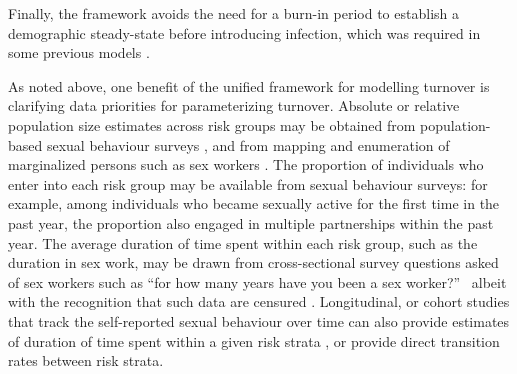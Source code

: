 Finally, the framework avoids the need for a burn-in period
to establish a demographic steady-state before introducing infection,
which was required in some previous models \citep{Boily2015}.

\par
As noted above, one benefit of the unified framework for modelling turnover	
is clarifying data priorities for parameterizing turnover. 
Absolute or relative population size estimates across
risk groups may be obtained from
population-based sexual behaviour surveys \citep{DHS}, and from
mapping and enumeration of marginalized persons
such as sex workers \citep{Abdul-Quader2014}.
The proportion of individuals who enter into each risk group
may be available from sexual behaviour surveys:
for example, among individuals who became sexually active for the first time in the past year,
the proportion also engaged in multiple partnerships within the past year.
The average duration of time spent within each risk group, such as
the duration in sex work,
may be drawn from
cross-sectional survey questions asked of sex workers such as
``for how many years have you been a sex worker?''\ %
albeit with the recognition that such data are censured \citep{Watts2010}.
Longitudinal, or cohort studies
that track the self-reported sexual behaviour over time can also provide 
estimates of duration of time spent within a given risk strata \citep{Fergus2007}, 
or provide direct transition rates between risk strata.

